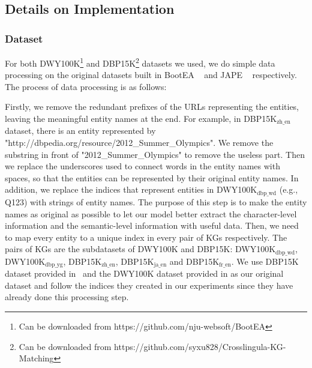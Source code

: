 
\vspace{-5mm}
\subsection{Details on Implementation} \label{sec:exp_details}

\subsubsection{Dataset}

For both DWY100K\footnote{Can be downloaded from https://github.com/nju-websoft/BootEA} and DBP15K\footnote{Can be downloaded from https://github.com/syxu828/Crosslingula-KG-Matching} datasets we used, we do simple data processing on the original datasets built in BootEA ~\cite{sun2018bootstrapping} and JAPE ~\cite{JAPE} respectively. The process of data processing is as follows:

Firstly, we remove the redundant prefixes of the URLs representing the entities, leaving the meaningful entity names at the end. For example, in DBP15K$_{\text{zh\_en}}$ dataset, there is an entity represented by "http://dbpedia.org/resource/2012\_Summer\_Olympics". We remove the substring in front of "2012\_Summer\_Olympics" to remove the useless part. Then we replace the underscores used to connect words in the entity names with spaces, so that the entities can be represented by their original entity names. In addition, we replace the indices that represent entities in DWY100K$_{\text{dbp\_wd}}$ (e.g., Q123) with strings of entity names. The purpose of this step is to make the entity names as original as possible to let our model better extract the character-level information and the semantic-level information with useful data. Then, we need to map every entity to a unique index in every pair of KGs respectively. The pairs of KGs are the subdatasets of DWY100K and DBP15K: DWY100K$_{\text{dbp\_wd}}$, DWY100K$_{\text{dbp\_yg}}$, DBP15K$_{\text{zh\_en}}$, DBP15K$_{\text{ja\_en}}$ and DBP15K$_{\text{fr\_en}}$. We use DBP15K dataset provided in~\cite{xu2019cross-lingual} and the DWY100K dataset provided in \cite{JAPE} as our original dataset and follow the indices they created in our experiments since they have already done this processing step.

